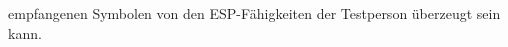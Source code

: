 \begin{loesung}
\begin{teilaufgaben}
empfangenen Symbolen von den ESP-Fähigkeiten der Testperson
überzeugt sein kann.
\qedhere
\end{teilaufgaben}
\end{loesung}
